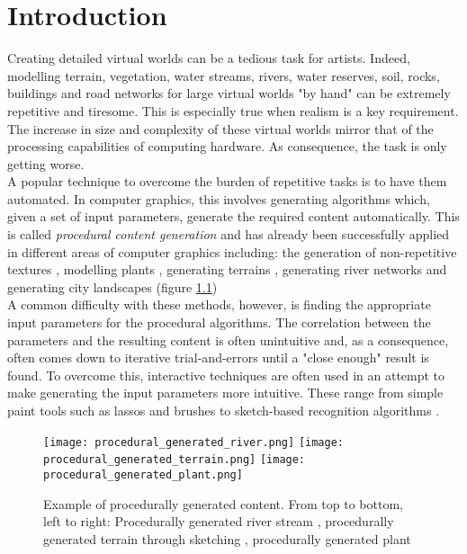 
\chapter{Introduction}
\par
Creating detailed virtual worlds can be a tedious task for artists. Indeed, modelling terrain, vegetation, water streams, rivers, water reserves, soil, rocks, buildings and road networks for large virtual worlds "by hand" can be extremely repetitive and tiresome. This is especially true when realism is a key requirement. The increase in size and complexity of these virtual worlds mirror that of the processing capabilities of computing hardware. As consequence, the task is only getting worse.\\

A popular technique to overcome the burden of repetitive tasks is to have them automated. In computer graphics, this involves generating algorithms which, given a set of input parameters, generate the required content automatically. This is called \textit{procedural content generation} and has already been successfully applied in different areas of computer graphics including: the generation of non-repetitive textures \cite{Efros1999,Liang2001,Wei2009}, modelling plants \cite{Boudon2012,Fourcaud2008,Guo2011,Lewis1999}, generating terrains \cite{Smelik2009,Gain2009,Doran2010}, generating river networks \cite{Derzapf2011,Emilien} and generating city landscapes \cite{Gain,Kelly2007} (figure \ref{Example of procedurally generated content}) \\
A common difficulty with these methods, however, is finding the appropriate input parameters for the procedural algorithms. The correlation between the parameters and the resulting content is often unintuitive and, as a consequence, often comes down to iterative trial-and-errors until a "close enough" result is found. To overcome this, interactive techniques are often used in an attempt to make generating the input parameters more intuitive. These range from simple paint tools such as lassos and brushes \cite{Emilien} to sketch-based recognition algorithms \cite{Gain2009}. \\

\begin{figure}[h]
  \centering
	\label{Example of procedurally generated content}
	\texttt{[image: procedural\_generated\_river.png]}
	\texttt{[image: procedural\_generated\_terrain.png]}
	\texttt{[image: procedural\_generated\_plant.png]}
	\caption{Example of procedurally generated content. From top to bottom, left to right: Procedurally generated river stream \cite{Derzapf2011}, procedurally generated terrain through sketching \cite{Gain2009}, procedurally generated plant \cite{Soler2001}}
\end{figure}

